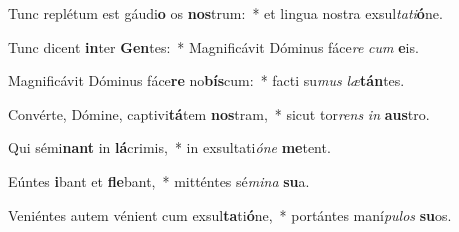 \item Tunc replétum est gáudi\textbf{o} os \textbf{nos}trum:~* et lingua nostra exsul\textit{ta}\textit{ti}\textbf{ó}ne.
\item Tunc dicent \textbf{in}ter \textbf{Gen}tes:~* Magnificávit Dóminus fáce\textit{re} \textit{cum} \textbf{e}is.
\item Magnificávit Dóminus fáce\textbf{re} no\textbf{bís}cum:~* facti su\textit{mus} \textit{læ}\textbf{tán}tes.
\item Convérte, Dómine, captivi\textbf{tá}tem \textbf{nos}tram,~* sicut tor\textit{rens} \textit{in} \textbf{aus}tro.
\item Qui sémi\textbf{nant} in \textbf{lá}crimis,~* in exsultati\textit{ó}\textit{ne} \textbf{me}tent.
\item Eúntes \textbf{i}bant et \textbf{fle}bant,~* mitténtes sé\textit{mi}\textit{na} \textbf{su}a.
\item Veniéntes autem vénient cum exsul\textbf{ta}ti\textbf{ó}ne,~* portántes maní\textit{pu}\textit{los} \textbf{su}os.
